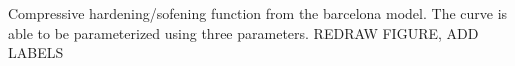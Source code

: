 \label{fig:barcelona} Compressive hardening/sofening function from the barcelona model. The curve is able to be parameterized using three parameters. REDRAW FIGURE, ADD LABELS